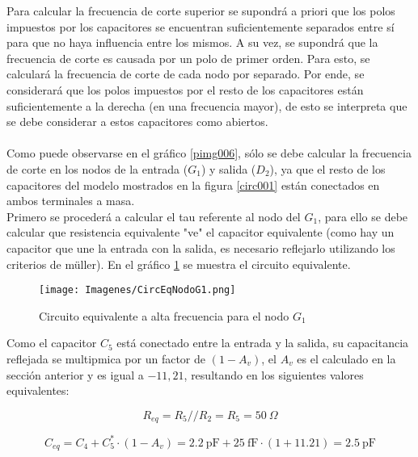 \documentclass[a4paper,10pt]{article}
\begin{document}
				\indent Para calcular la frecuencia de corte superior se supondrá a priori que los polos impuestos por los capacitores se encuentran suficientemente 
				separados entre sí para que no haya influencia entre los mismos. A su vez, se supondrá que la frecuencia de corte es causada por un polo de 
				primer orden. Para esto, se calculará la frecuencia de corte de cada nodo por separado. Por ende, se considerará que los polos impuestos por el 
				resto de los capacitores están suficientemente a la derecha (en una frecuencia mayor), de esto se interpreta que se debe considerar a estos 
				capacitores como abiertos. \\ \\
				\indent Como puede observarse en el gráfico \ref{pimg006}, sólo se debe calcular la frecuencia de corte en los nodos de la entrada ($G_1$) y 
				salida ($D_2$), ya que el resto de los capacitores del modelo mostrados en la figura \ref{circ001} están conectados en ambos terminales a masa. \\
				\indent Primero se procederá a calcular el tau referente al nodo del $G_1$, para ello se debe calcular que resistencia equivalente "ve" 
				el capacitor equivalente (como hay un capacitor que une la entrada con la salida, es necesario reflejarlo utilizando los criterios de müller). 
				En el gráfico \ref{pimg007} se muestra el circuito equivalente. \\

				\begin{figure}[!htb]
					\centering
						\texttt{[image: Imagenes/CircEqNodoG1.png]}
						\caption{Circuito equivalente a alta frecuencia para el nodo $G_1$} \label{pimg007}
				\end{figure}
				
				\indent Como el capacitor $C_5$ está conectado entre la entrada y la salida, su capacitancia reflejada se multipmica por un factor 
				de $(1 - A_v)$, el $A_v$ es el calculado en la sección anterior y es igual a $-11,21$, resultando en los siguientes valores equivalentes:
				
				\begin{equation}
					R_{eq} = R_5 // R_2 = R_5 = 50~\Omega
				\end{equation}
				
				\begin{equation}
					C_{eq} = C_4 + C_5^{*} \cdot (1 - A_v) = 2.2~\text{pF} + 25~\text{fF} \cdot (1 + 11.21) = 2.5~\text{pF}
				\end{equation}
				
\end{document}
